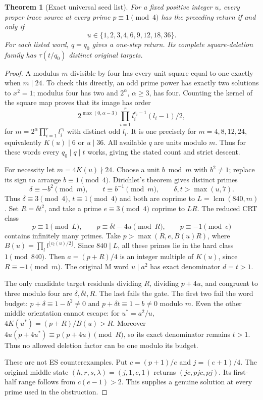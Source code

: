 \documentclass[11pt]{article}
\newtheorem{theorem}{Theorem}
\begin{document}
\begin{theorem}[Exact universal seed list]
For a fixed positive integer $u$, every proper trace source at every prime
$p\equiv1\pmod4$ has the preceding return if and only if
\[
 \boxed{u\in\{1,2,3,4,6,9,12,18,36\}.}
\]
For each listed word, $q=q_0$ gives a one-step return. Its complete square-deletion
family has $\tau(t/q_0)$ distinct original targets.
\end{theorem}
\begin{proof}
A modulus $m$ divisible by four has every unit square equal to one exactly when
$m\mid24$. To check this directly, an odd prime power has exactly two solutions
to $x^2=1$; modulus four has two and $2^\alpha$, $\alpha\ge3$, has four.
Counting the kernel of the square map proves that its image has order
\[
 2^{\max(0,\alpha-3)}
 \prod_{i=1}^{r}l_i^{e_i-1}(l_i-1)/2,
\]
for $m=2^\alpha\prod_{i=1}^{r}l_i^{e_i}$ with distinct odd $l_i$.
It is one precisely for $m=4,8,12,24$, equivalently $K(u)\mid6$ or $u\mid36$.
All available $q$ are units modulo $m$. Thus for these words every $q_0\mid q\mid t$
works, giving the stated count and strict descent.

For necessity let $m=4K(u)\nmid24$. Choose a unit $b\bmod m$ with $b^2\ne1$;
replace its sign to arrange $b\equiv1\pmod4$.
Dirichlet's theorem \cite[Theorem 18.1]{Dirichlet} gives distinct primes
\[
 \delta\equiv-b^2\pmod m,\qquad t\equiv b^{-1}\pmod m,
 \qquad \delta,t>\max(u,7).
\]
Thus $\delta\equiv3\pmod4$, $t\equiv1\pmod4$ and both are coprime to
$L=\operatorname{lcm}(840,m)$. Set $R=\delta t^2$, and take a prime
$e\equiv3\pmod4$ coprime to $LR$. The reduced CRT class
\[
 p\equiv1\pmod L,\qquad p\equiv\delta t-4u\pmod R,
 \qquad p\equiv-1\pmod e
\]
contains infinitely many primes. Take $p>\max(R,e,B(u)R)$, where
$B(u)=\prod_l l^{\lfloor v_l(u)/2\rfloor}$.
Since $840\mid L$, all these primes lie in the hard class $1\pmod{840}$.
Then $a=(p+R)/4$ is an integer multiple of $K(u)$, since $R\equiv-1\pmod m$.
The original M word $u\mid a^2$ has exact denominator $d=t>1$.

The only candidate target residuals dividing $R$, dividing $p+4u$, and
congruent to three modulo four are
$\delta,\delta t,R$. The last fails the gate. The first two fail the word budget:
$p+\delta\equiv1-b^2\ne0$ and $p+\delta t\equiv1-b\ne0$ modulo $m$.
Even the other middle orientation cannot escape: for $u^*=a^2/u$,
$4K(u^*)=(p+R)/B(u)>R$.  Moreover
$4u(p+4u^*)\equiv p(p+4u)\pmod R$, so its exact denominator remains
$t>1$.  Thus no allowed deletion factor can be one modulo its budget.

These are not ES counterexamples. Put $c=(p+1)/e$ and $j=(e+1)/4$.
The original middle state $(h,r,s,\lambda)=(j,1,c,1)$ returns
$(jc,pjc,pj)$. Its first-half range follows from $c(e-1)>2$.
This supplies a genuine solution at every prime used in the obstruction.
\end{proof}
\end{document}
